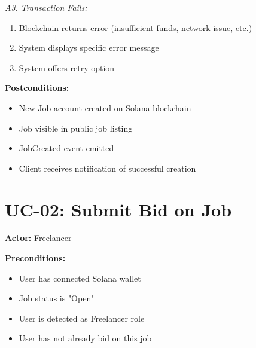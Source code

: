 \documentclass[a4paper,13pt,twoside]{report}
\theoremstyle{definition}
\begin{document}
\textit{A3. Transaction Fails:}
\begin{enumerate}
    \item Blockchain returns error (insufficient funds, network issue, etc.)
    \item System displays specific error message
    \item System offers retry option
\end{enumerate}

\textbf{Postconditions:}
\begin{itemize}
    \item New Job account created on Solana blockchain
    \item Job visible in public job listing
    \item JobCreated event emitted
    \item Client receives notification of successful creation
\end{itemize}

\section{UC-02: Submit Bid on Job}

\textbf{Actor:} Freelancer

\textbf{Preconditions:}
\begin{itemize}
    \item User has connected Solana wallet
    \item Job status is "Open"
    \item User is detected as Freelancer role
    \item User has not already bid on this job
\end{itemize}
\end{document}
